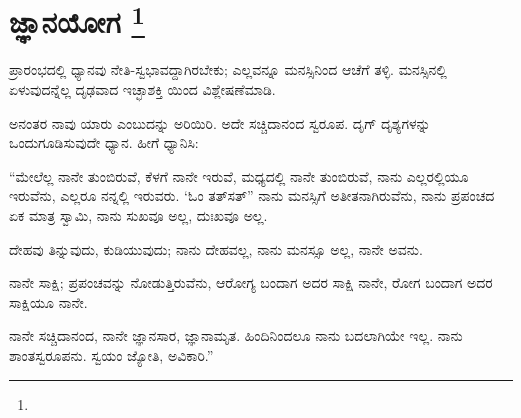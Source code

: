 
\chapter[ಜ್ಞಾನಯೋಗ ]{ಜ್ಞಾನಯೋಗ \protect\footnote{}}

ಪ್ರಾರಂಭದಲ್ಲಿ ಧ್ಯಾನವು ನೇತಿ-ಸ್ವಭಾವದ್ದಾಗಿರಬೇಕು; ಎಲ್ಲವನ್ನೂ ಮನಸ್ಸಿನಿಂದ ಆಚೆಗೆ ತಳ್ಳಿ. ಮನಸ್ಸಿನಲ್ಲಿ ಏಳುವುದನ್ನೆಲ್ಲ ದೃಢವಾದ ಇಚ್ಛಾಶಕ್ತಿ ಯಿಂದ ವಿಶ್ಲೇಷಣೆಮಾಡಿ.

ಅನಂತರ ನಾವು ಯಾರು ಎಂಬುದನ್ನು ಅರಿಯಿರಿ. ಅದೇ ಸಚ್ಚಿದಾನಂದ ಸ್ವರೂಪ. ದೃಗ್​ ದೃಶ್ಯಗಳನ್ನು ಒಂದುಗೂಡಿಸುವುದೇ ಧ್ಯಾನ. ಹೀಗೆ ಧ್ಯಾನಿಸಿ:

“ಮೇಲೆಲ್ಲ ನಾನೇ ತುಂಬಿರುವೆ, ಕೆಳಗೆ ನಾನೇ ಇರುವೆ, ಮಧ್ಯದಲ್ಲಿ ನಾನೇ ತುಂಬಿರುವೆ, ನಾನು ಎಲ್ಲರಲ್ಲಿಯೂ ಇರುವೆನು, ಎಲ್ಲರೂ ನನ್ನಲ್ಲಿ ಇರುವರು. ‘ಓಂ ತತ್​ಸತ್​” ನಾನು ಮನಸ್ಸಿಗೆ ಅತೀತನಾಗಿರುವೆನು, ನಾನು ಪ್ರಪಂಚದ ಏಕ ಮಾತ್ರ ಸ್ವಾಮಿ, ನಾನು ಸುಖವೂ ಅಲ್ಲ, ದುಃಖವೂ ಅಲ್ಲ.

ದೇಹವು ತಿನ್ನುವುದು, ಕುಡಿಯುವುದು; ನಾನು ದೇಹವಲ್ಲ, ನಾನು ಮನಸ್ಸೂ ಅಲ್ಲ, ನಾನೇ ಅವನು.

ನಾನೇ ಸಾಕ್ಷಿ; ಪ್ರಪಂಚವನ್ನು ನೋಡುತ್ತಿರುವೆನು, ಆರೋಗ್ಯ ಬಂದಾಗ ಅದರ ಸಾಕ್ಷಿ ನಾನೇ, ರೋಗ ಬಂದಾಗ ಅದರ ಸಾಕ್ಷಿಯೂ ನಾನೇ.

ನಾನೇ ಸಚ್ಚಿದಾನಂದ, ನಾನೇ ಜ್ಞಾನಸಾರ, ಜ್ಞಾನಾಮೃತ. ಹಿಂದಿನಿಂದಲೂ ನಾನು ಬದಲಾಗಿಯೇ ಇಲ್ಲ. ನಾನು ಶಾಂತಸ್ವರೂಪನು. ಸ್ವಯಂ ಜ್ಯೋತಿ, ಅವಿಕಾರಿ.”

